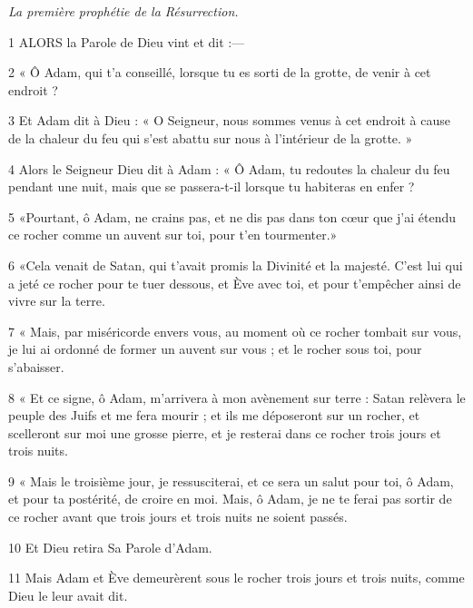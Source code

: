 
\par \textit{La première prophétie de la Résurrection.}

\par 1 ALORS la Parole de Dieu vint et dit :—

\par 2 « Ô Adam, qui t'a conseillé, lorsque tu es sorti de la grotte, de venir à cet endroit ?

\par 3 Et Adam dit à Dieu : « O Seigneur, nous sommes venus à cet endroit à cause de la chaleur du feu qui s'est abattu sur nous à l'intérieur de la grotte. »

\par 4 Alors le Seigneur Dieu dit à Adam : « Ô Adam, tu redoutes la chaleur du feu pendant une nuit, mais que se passera-t-il lorsque tu habiteras en enfer ?

\par 5 «Pourtant, ô Adam, ne crains pas, et ne dis pas dans ton cœur que j'ai étendu ce rocher comme un auvent sur toi, pour t'en tourmenter.»

\par 6 «Cela venait de Satan, qui t'avait promis la Divinité et la majesté. C'est lui qui a jeté ce rocher pour te tuer dessous, et Ève avec toi, et pour t'empêcher ainsi de vivre sur la terre.

\par 7 « Mais, par miséricorde envers vous, au moment où ce rocher tombait sur vous, je lui ai ordonné de former un auvent sur vous ; et le rocher sous toi, pour s'abaisser.

\par 8 « Et ce signe, ô Adam, m'arrivera à mon avènement sur terre : Satan relèvera le peuple des Juifs et me fera mourir ; et ils me déposeront sur un rocher, et scelleront sur moi une grosse pierre, et je resterai dans ce rocher trois jours et trois nuits.

\par 9 « Mais le troisième jour, je ressusciterai, et ce sera un salut pour toi, ô Adam, et pour ta postérité, de croire en moi. Mais, ô Adam, je ne te ferai pas sortir de ce rocher avant que trois jours et trois nuits ne soient passés.

\par 10 Et Dieu retira Sa Parole d'Adam.

\par 11 Mais Adam et Ève demeurèrent sous le rocher trois jours et trois nuits, comme Dieu le leur avait dit.

